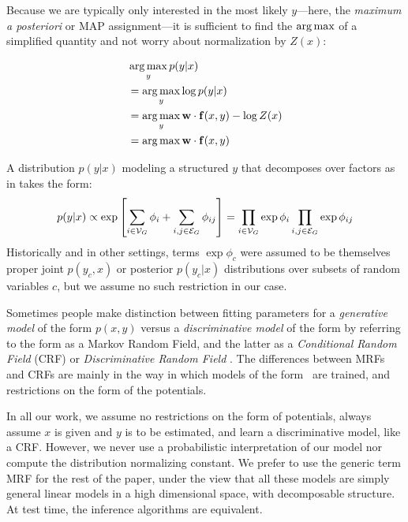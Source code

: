 Because we are typically only interested in the most likely $y$---here, the 
{\em maximum a posteriori} or MAP assignment---it is sufficient to find the 
$\mathop{\arg\max}$ of a simplified quantity and not worry about normalization by $Z(x)$:

\begin{align}
&\mathop{\arg\max}_y p(y|x) \\
&= \mathop{\arg\max}_y \log p(y|x) \\
&= \mathop{\arg\max}_y \mathbf{w} \cdot \mathbf{f}(x,y) - \log Z(x) \\
&= \mathop{\arg\max} \mathbf{w} \cdot \mathbf{f}(x,y)
\end{align}

A distribution $p(y|x)$ modeling a structured $y$ that decomposes over factors 
as in  takes the form:
\begin{equation}
p(y|x) \propto\exp\left[  \sum_{i \in \mathcal{V}_G} \phi_i + \sum_{i,j \in \mathcal{E}_G}  
\phi_{ij}\right] = \prod_{i \in \mathcal{V}_G} \exp \phi_i  \prod_{i,j \in \mathcal{E}_G} \exp 
\phi_{ij}
\label{eq:crf}
\end{equation}
Historically and in other settings, terms $\exp \phi_c$ were assumed to be 
themselves proper joint $p(y_c,x)$ or posterior $p(y_c|x)$ distributions over 
subsets of random variables $c$, but we assume no such restriction in our case.  

Sometimes people make distinction between fitting parameters for a {\em 
generative model} of the form $p(x,y)$ versus a {\em discriminative model} of 
the form by referring to the form as a Markov Random Field, and the latter as a 
{\em Conditional Random Field} (CRF) \citep{lafferty01crfs} or {\em 
Discriminative Random Field} \citep{kumar2003discriminative}.  The differences 
between MRFs and CRFs are mainly in the way in which models of the 
form~ are trained, and restrictions on the form of the potentials.  

In all our work, we assume no restrictions on the form of potentials, always 
assume $x$ is given and $y$ is to be estimated, and learn a discriminative 
model, like a CRF.  However, we never use a probabilistic interpretation of our 
model nor compute the distribution normalizing constant.  We prefer to use the 
generic term MRF for the rest of the paper, under the view that all these 
models are simply general linear models in a high dimensional space, with 
decomposable structure.  At test time, the inference algorithms are equivalent.  

